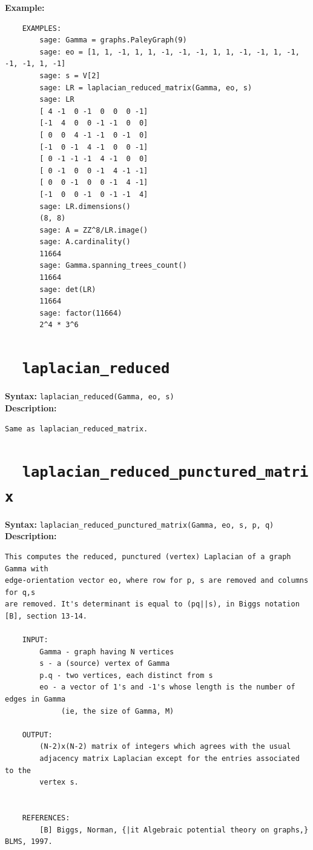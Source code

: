\documentclass{article}
\begin{document}
\textbf{Example:}
\begin{verbatim}
    EXAMPLES:
        sage: Gamma = graphs.PaleyGraph(9)
        sage: eo = [1, 1, -1, 1, 1, -1, -1, -1, 1, 1, -1, -1, 1, -1, -1, -1, 1, -1]
        sage: s = V[2]
        sage: LR = laplacian_reduced_matrix(Gamma, eo, s)
        sage: LR
        [ 4 -1  0 -1  0  0  0 -1]
        [-1  4  0  0 -1 -1  0  0]
        [ 0  0  4 -1 -1  0 -1  0]
        [-1  0 -1  4 -1  0  0 -1]
        [ 0 -1 -1 -1  4 -1  0  0]
        [ 0 -1  0  0 -1  4 -1 -1]
        [ 0  0 -1  0  0 -1  4 -1]
        [-1  0  0 -1  0 -1 -1  4]
        sage: LR.dimensions()
        (8, 8)
        sage: A = ZZ^8/LR.image()
        sage: A.cardinality()
        11664
        sage: Gamma.spanning_trees_count()
        11664
        sage: det(LR)
        11664
        sage: factor(11664)
        2^4 * 3^6
\end{verbatim}

\section{\tt \ \ laplacian\_reduced}

\textbf{Syntax:} \verb}laplacian_reduced(Gamma, eo, s)}\\

\textbf{Description:}
\begin{verbatim}
Same as laplacian_reduced_matrix.
\end{verbatim}

\section{\tt\ \  laplacian\_reduced\_punctured\_matrix}
  
\textbf{Syntax:} \verb}laplacian_reduced_punctured_matrix(Gamma, eo, s, p, q)}\\

\textbf{Description:}
\begin{verbatim}
This computes the reduced, punctured (vertex) Laplacian of a graph Gamma with 
edge-orientation vector eo, where row for p, s are removed and columns for q,s
are removed. It's determinant is equal to (pq||s), in Biggs notation [B], section 13-14.

    INPUT:
        Gamma - graph having N vertices
        s - a (source) vertex of Gamma
        p.q - two vertices, each distinct from s
        eo - a vector of 1's and -1's whose length is the number of edges in Gamma
             (ie, the size of Gamma, M)

    OUTPUT:
        (N-2)x(N-2) matrix of integers which agrees with the usual
        adjacency matrix Laplacian except for the entries associated to the
        vertex s.


    REFERENCES:
        [B] Biggs, Norman, {|it Algebraic potential theory on graphs,} BLMS, 1997.

\end{verbatim}
\end{document}

